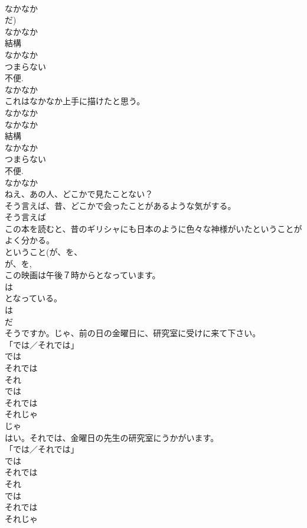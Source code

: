 \documentclass[8pt]{extreport}
\begin{document}
\begin{CJK}{UTF8}{min}
{\\	なかなか 
\\	だ) 
\\	なかなか 
\\	結構 
\\	なかなか 
\\	つまらない 
\\	不便. 
\\	なかなか 
\\	これはなかなか上手に描けたと思う。	
\\	なかなか 
\\	なかなか 
\\	結構 
\\	なかなか 
\\	つまらない 
\\	不便. 
\\	なかなか 
\\	ねえ、あの人、どこかで見たことない？ 
\\	そう言えば、昔、どこかで会ったことがあるような気がする。	
\\	そう言えば 
\\	この本を読むと、昔のギリシャにも日本のように色々な神様がいたということがよく分かる。	
\\	ということ(が、を、
\\	が、を, 
\\	この映画は午後７時からとなっています。	
\\	は
\\	となっている。 
\\	は
\\	だ 
\\	そうですか。じゃ、前の日の金曜日に、研究室に受けに来て下さい。	
\\	「では／それでは」
\\	では 
\\	それでは 
\\	それ 
\\	では 
\\	それでは 
\\	それじゃ 
\\	じゃ 
\\	はい。それでは、金曜日の先生の研究室にうかがいます。	
\\	「では／それでは」
\\	では 
\\	それでは 
\\	それ 
\\	では 
\\	それでは 
\\	それじゃ 
}
\end{CJK}
\end{document}
